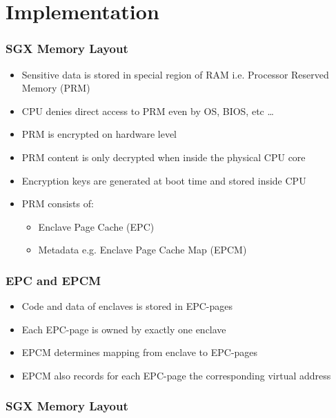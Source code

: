 \section{Implementation}

\begin{frame}
    \frametitle{SGX Memory Layout}
    \begin{itemize}[<+->]
        \item Sensitive data is stored in special region of RAM i.e. Processor Reserved Memory (PRM)
        \item CPU denies direct access to PRM even by OS, BIOS, etc \dots
        \item PRM is encrypted on hardware level
        \item PRM content is only decrypted when inside the physical CPU core
        \item Encryption keys are generated at boot time and stored inside CPU
        \item PRM consists of:
        \begin{itemize}
            \item Enclave Page Cache (EPC)
            \item Metadata e.g. Enclave Page Cache Map (EPCM)
        \end{itemize}
    \end{itemize}
\end{frame}

\begin{frame}
    \frametitle{EPC and EPCM}
    \begin{itemize}[<+->]
        \item Code and data of enclaves is stored in EPC-pages
        \item Each EPC-page is owned by exactly one enclave
        \item EPCM determines mapping from enclave to EPC-pages
        \item EPCM also records for each EPC-page the corresponding virtual address
    \end{itemize}
\end{frame}

\begin{frame}
    \frametitle{SGX Memory Layout}
    \centering
\end{frame}

